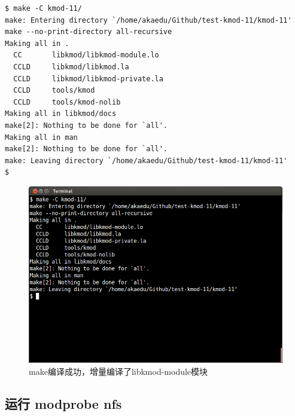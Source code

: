 {\begin{shaded}\begin{verbatim}
$ make -C kmod-11/
make: Entering directory `/home/akaedu/Github/test-kmod-11/kmod-11'
make --no-print-directory all-recursive
Making all in .
  CC       libkmod/libkmod-module.lo
  CCLD     libkmod/libkmod.la
  CCLD     libkmod/libkmod-private.la
  CCLD     tools/kmod
  CCLD     tools/kmod-nolib
Making all in libkmod/docs
make[2]: Nothing to be done for `all'.
Making all in man
make[2]: Nothing to be done for `all'.
make: Leaving directory `/home/akaedu/Github/test-kmod-11/kmod-11'
$ 
\end{verbatim}\end{shaded}}
\begin{figure}[htbp]
\centering
\includegraphics{./pictures/3-2-make.png}
\caption{make编译成功，增量编译了libkmod-module模块}
\end{figure}

\subsection{运行 modprobe nfs}

